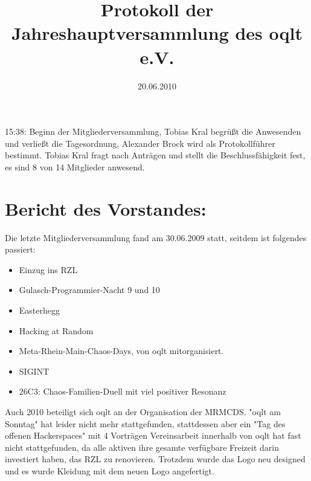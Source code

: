 \documentclass{scrartcl}
\begin{document}
\title{Protokoll der Jahreshauptversammlung des oqlt e.V.}
\date{20.06.2010}
\maketitle

\newcommand\MV{Mitgliederversammlung}

\tableofcontents
\hspace{1em}

15:38: Beginn der Mitgliederversammlung, Tobias Kral begrüßt die Anwesenden und verließt die Tagesordnung,
Alexander Brock wird als Protokollführer bestimmt. Tobias Kral fragt nach Anträgen und stellt die Beschlussfähigkeit fest,
es sind 8 von 14 Mitglieder anwesend.

\section{Bericht des Vorstandes:} {

Die letzte Mitgliederversammlung fand am 30.06.2009 statt, seitdem ist folgendes passiert:
\begin{itemize}
\item Einzug ins RZL
\item Gulasch-Programmier-Nacht 9 und 10
\item Easterhegg
\item Hacking at Random
\item Meta-Rhein-Main-Chaos-Days, von oqlt mitorganisiert.
\item SIGINT
\item 26C3: Chaos-Familien-Duell mit viel positiver Resonanz
\end{itemize}

Auch 2010 beteiligt sich oqlt an der Organisation der MRMCDS.
"oqlt am Sonntag" hat leider nicht mehr stattgefunden,
stattdessen aber ein "Tag des offenen Hackerspaces" mit 4 Vorträgen
Vereinsarbeit innerhalb von oqlt hat fast nicht stattgefunden,
da alle aktiven ihre gesamte verfügbare Freizeit darin investiert haben,
das RZL zu renovieren. Trotzdem wurde das Logo neu designed
und es wurde Kleidung mit dem neuen Logo angefertigt.

}
\end{document}
